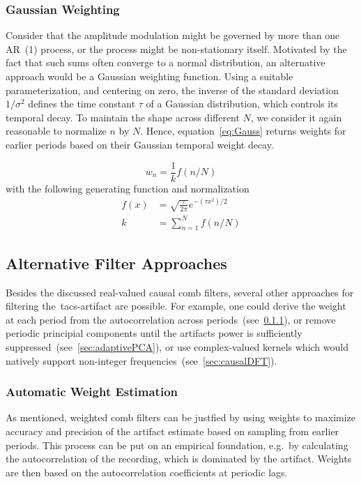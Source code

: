 \documentclass[a4paper]{article}
\newcommand{\secref}[1]{(see~\ref{#1})}
\begin{document}
\subsubsection{Gaussian Weighting}

Consider that the amplitude modulation might be governed by more than one AR~(1) process, or the process might be non-stationary itself.
Motivated by the fact that such sums  often converge to a normal distribution, an alternative approach would be a Gaussian weighting function.
Using a suitable parameterization, and centering on zero, the inverse of the standard deviation $1/\sigma^2$ defines the time constant $\tau$ of a Gaussian distribution, which controls its temporal decay.
To maintain the shape across different $N$, we consider it again reasonable to normalize $n$ by $N$. Hence, equation~\eqref{eq:Gauss} returns weights for earlier periods based on their Gaussian temporal weight decay.

\begin{equation}
    w_n = \frac{1}{k} f(n/N)\label{eq:Gauss}
\end{equation}
with the following generating function and normalization
\begin{align}
    f(x)  & = \sqrt{\frac{\tau}{2\pi}} e^{-(\tau x^2)/2}  \\
    k  & = \sum_{n=1}^{N} f(n/N)\label{eq:NormGauss}
\end{align}

\subsection{Alternative Filter Approaches}

Besides the discussed real-valued causal comb filters, several other approaches for filtering the~\gls{tacs}-artifact are possible. For example, one could derive the weight at each period from the autocorrelation across periods~\secref{sec:automaticKernel}, or remove periodic principial components until the artifacts power is sufficiently suppressed~\secref{sec:adaptivePCA}, or use complex-valued kernels which would natively support non-integer frequencies~\secref{sec:causalDFT}.

\subsubsection{Automatic Weight Estimation}\label{sec:automaticKernel}

As mentioned, weighted comb filters can be justfied by using  weights to maximize accuracy and precision of the artifact estimate based on sampling from earlier periods.
This process can be put on an empirical foundation, e.g.\ by calculating the autocorrelation of the recording, which is dominated by the artifact. Weights are then based on the autocorrelation coefficients at periodic lags.
\end{document}

